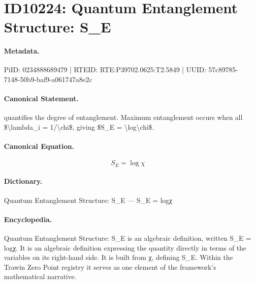 \section*{ID10224: Quantum Entanglement Structure: S\_E}
\paragraph{Metadata.}
PiID: 0234888689479 | RTEID: RTE:P39702.0625:T2.5849 | UUID: 57c89785-7148-50b9-baf9-a061747a8e2c

\paragraph{Canonical Statement.}
quantifies the degree of entanglement. Maximum entanglement occurs when all \$\textbackslash{}lambda\_i = 1/\textbackslash{}chi\$, giving \$S\_E = \textbackslash{}log\textbackslash{}chi\$.

\paragraph{Canonical Equation.}
\[
S_E = \log\chi
\]

\paragraph{Dictionary.}
Quantum Entanglement Structure: S\_E — S\_E = logχ

\paragraph{Encyclopedia.}
Quantum Entanglement Structure: S\_E is an algebraic definition, written S\_E = logχ. It is an algebraic definition expressing the quantity directly in terms of the variables on its right-hand side. It is built from χ, defining S\_E. Within the Trawin Zero Point registry it serves as one element of the framework's mathematical narrative.
